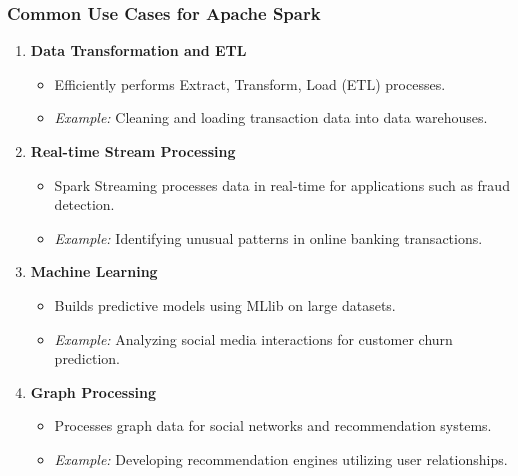 \documentclass[aspectratio=169]{beamer}
\begin{document}
\begin{frame}[fragile]
    \frametitle{Common Use Cases for Apache Spark}
    \begin{enumerate}
        \item \textbf{Data Transformation and ETL}
            \begin{itemize}
                \item Efficiently performs Extract, Transform, Load (ETL) processes.
                \item \textit{Example:} Cleaning and loading transaction data into data warehouses.
            \end{itemize}
        \item \textbf{Real-time Stream Processing}
            \begin{itemize}
                \item Spark Streaming processes data in real-time for applications such as fraud detection.
                \item \textit{Example:} Identifying unusual patterns in online banking transactions.
            \end{itemize}
        \item \textbf{Machine Learning}
            \begin{itemize}
                \item Builds predictive models using MLlib on large datasets.
                \item \textit{Example:} Analyzing social media interactions for customer churn prediction.
            \end{itemize}
        \item \textbf{Graph Processing}
            \begin{itemize}
                \item Processes graph data for social networks and recommendation systems.
                \item \textit{Example:} Developing recommendation engines utilizing user relationships.
            \end{itemize}
    \end{enumerate}
\end{frame}
\end{document}

